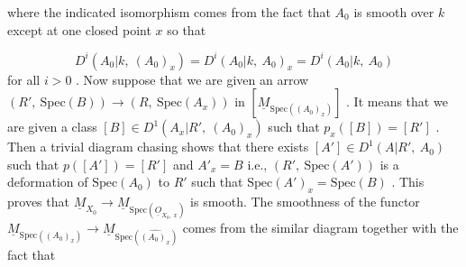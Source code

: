 where the indicated isomorphism comes from the fact that  $A_0$  is smooth over  $k$  except at one closed point  $x$  so that

$$D^i(A_0|k,\ (A_0)_x) = D^i(A_0|k,\ A_0)_x = D^i(A_0|k,\ A_0)$$
for all  $i > 0$ . Now suppose that we are given an arrow $(R',\ \mathrm{Spec}(B)) \to (R,\ \mathrm{Spec}(A_x))$  in  $[\underline{M}_{\mathrm{Spec}((A_0)_x)}]$ . It means that we are given a class $[B] \in D^1(A_x|R',\ (A_0)_x)$  such that  $p_x([B]) = [R']$ . Then a trivial diagram chasing shows that there exists $[A'] \in D^1(A|R',\ A_0)$  such that $p([A']) = [R']$  and  $A'_x = B$  i.e.,  $(R',\ \mathrm{Spec}(A'))$  is a deformation of  $\mathrm{Spec}(A_0)$ to  $R'$  such that  $\mathrm{Spec}(A')_x = \mathrm{Spec}(B)$ . This proves that $\underline{M}_{X_0} \to \underline{M}_{\mathrm{Spec}(\underline{O}_{X_0,\ x})}$ is smooth. The smoothness of the functor  $\underline{M}_{\mathrm{Spec}((A_0)_x)} \to \underline{M}_{\mathrm{Spec}(\widehat{(A_0)_x})}$ comes from the similar diagram together with the fact that

